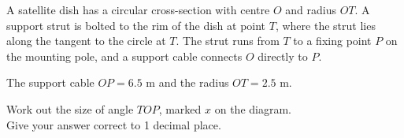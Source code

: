 \begin{question}
\noindent A satellite dish has a circular cross-section with centre $O$ and radius $OT$. A support strut is bolted to the rim of the dish at point $T$, where the strut lies along the tangent to the circle at $T$. The strut runs from $T$ to a fixing point $P$ on the mounting pole, and a support cable connects $O$ directly to $P$.

The support cable $OP = 6.5$ m and the radius $OT = 2.5$ m.

\begin{center}
\end{center}

\noindent Work out the size of angle $TOP$, marked $x$ on the diagram.\\
Give your answer correct to 1 decimal place.

\vspace{4cm}

\begin{flushright}
\end{flushright}
\end{question}
